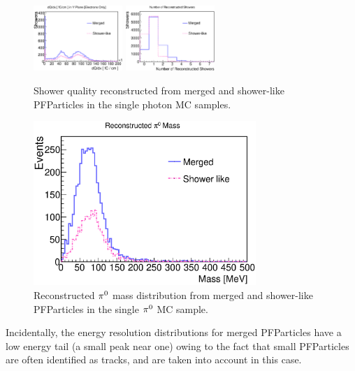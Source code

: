 \begin{figure}[htbp]
\begin{center}
\includegraphics[width=0.3\textwidth]{figs/ongoing/gamma/dQdxY.eps}
\includegraphics[width=0.3\textwidth]{figs/ongoing/gamma/NRecoShowers.eps}
\caption{Shower quality reconstructed from merged and shower-like PFParticles
in the single photon MC samples.}
\label{fig:shr_quality_merged_single_gamma}
\end{center}
\end{figure}
\begin{figure}[htbp]
\begin{center}
\includegraphics[width=0.75\textwidth]{figs/ongoing/pi0/RecoPi0Mass.eps}
\caption{Reconstructed ${\pi}^0$ mass distribution from merged and
shower-like PFParticles in the single ${\pi}^0$ MC sample.}
\label{fig:mpi0_merged_single_pi0}
\end{center}
\end{figure}
Incidentally,
the energy resolution distributions for merged PFParticles have a 
low energy tail (a small peak near one) owing to the fact that
small PFParticles are often identified as tracks, and are taken into
account in this case.

